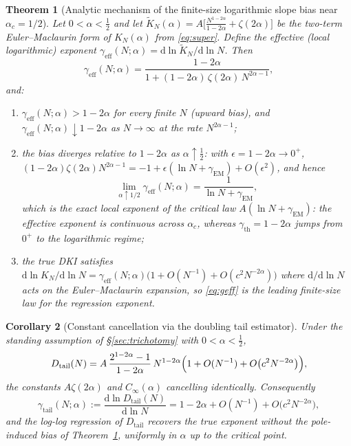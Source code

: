 \documentclass[11pt,reqno]{amsart}
\theoremstyle{plain}
\newtheorem{theorem}{Theorem}[section]
\newtheorem{corollary}[theorem]{Corollary}
\theoremstyle{definition}
\theoremstyle{remark}
\numberwithin{equation}{section}
\newcommand{\dd}{\mathrm{d}}
\newcommand{\Dtail}{D_{\mathrm{tail}}}
\newcommand{\gth}{\gamma_{\mathrm{th}}}
\newcommand{\gtail}{\gamma_{\mathrm{tail}}}
\newcommand{\geff}{\gamma_{\mathrm{eff}}}
\begin{document}
\begin{theorem}[Analytic mechanism of the finite-size logarithmic slope bias near $\alpha_c=1/2$]\label{thm:fss}
Let $0<\alpha<\frac12$ and let $\widetilde K_N(\alpha)=A\bigl[\frac{N^{1-2\alpha}}{1-2\alpha}+\zeta(2\alpha)\bigr]$ be the two-term Euler--Maclaurin form of $K_N(\alpha)$ from \eqref{eq:super}. Define the effective (local logarithmic) exponent $\geff(N;\alpha)=\dd\ln\widetilde K_N/\dd\ln N$. Then
\begin{equation}\label{eq:geff}
\geff(N;\alpha)=\frac{1-2\alpha}{1+(1-2\alpha)\,\zeta(2\alpha)\,N^{2\alpha-1}},
\end{equation}
and:
\begin{enumerate}[label=\textup{(\roman*)}]
\item $\geff(N;\alpha)>1-2\alpha$ for every finite $N$ (upward bias), and $\geff(N;\alpha)\downarrow1-2\alpha$ as $N\to\infty$ at the rate $N^{2\alpha-1}$;
\item the bias diverges relative to $1-2\alpha$ as $\alpha\uparrow\frac12$: with $\epsilon=1-2\alpha\to0^+$, $(1-2\alpha)\zeta(2\alpha)N^{2\alpha-1}=-1+\epsilon(\ln N+\gamma_{\mathrm{EM}})+O(\epsilon^2)$, and hence
\begin{equation}\label{eq:geffcrit}
\lim_{\alpha\uparrow1/2}\geff(N;\alpha)=\frac1{\ln N+\gamma_{\mathrm{EM}}},
\end{equation}
which is the exact local exponent of the critical law $A(\ln N+\gamma_{\mathrm{EM}})$: the effective exponent is continuous across $\alpha_c$, whereas $\gth=1-2\alpha$ jumps from $0^+$ to the logarithmic regime;
\item the true DKI satisfies $\dd\ln K_N/\dd\ln N=\geff(N;\alpha)\bigl(1+O(N^{-1})+O(c^2N^{-2\alpha})\bigr)$ where $\dd/\dd\ln N$ acts on the Euler--Maclaurin expansion, so \eqref{eq:geff} is the leading finite-size law for the regression exponent.
\end{enumerate}
\end{theorem}

\begin{corollary}[Constant cancellation via the doubling tail estimator]\label{cor:tail}
Under the standing assumption of \S\ref{sec:trichotomy} with $0<\alpha<\frac12$,
\begin{equation}\label{eq:Dtailsuper}
\Dtail(N)=A\,\frac{2^{1-2\alpha}-1}{1-2\alpha}\,N^{1-2\alpha}\Bigl(1+O(N^{-1})+O\bigl(c^2N^{-2\alpha}\bigr)\Bigr),
\end{equation}
the constants $A\zeta(2\alpha)$ and $C_\infty(\alpha)$ cancelling identically. Consequently
\begin{equation}\label{eq:gtail}
\gtail(N;\alpha):=\frac{\dd\ln\Dtail(N)}{\dd\ln N}=1-2\alpha+O(N^{-1})+O\bigl(c^2N^{-2\alpha}\bigr),
\end{equation}
and the log-log regression of $\Dtail$ recovers the true exponent without the pole-induced bias of Theorem~\ref{thm:fss}, uniformly in $\alpha$ up to the critical point.
\end{corollary}
\end{document}

